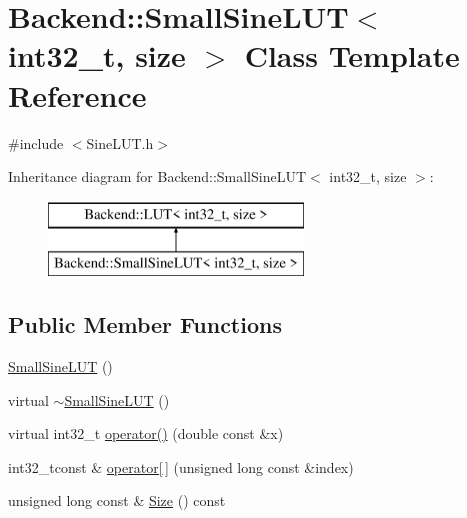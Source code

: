 \hypertarget{class_backend_1_1_small_sine_l_u_t_3_01int32__t_00_01size_01_4}{\section{Backend\+:\+:Small\+Sine\+L\+U\+T$<$ int32\+\_\+t, size $>$ Class Template Reference}
\label{class_backend_1_1_small_sine_l_u_t_3_01int32__t_00_01size_01_4}
}


{\ttfamily \#include $<$Sine\+L\+U\+T.\+h$>$}

Inheritance diagram for Backend\+:\+:Small\+Sine\+L\+U\+T$<$ int32\+\_\+t, size $>$\+:\begin{figure}[H]
\begin{center}
\leavevmode
\includegraphics[height=2.000000cm]{class_backend_1_1_small_sine_l_u_t_3_01int32__t_00_01size_01_4}
\end{center}
\end{figure}
\subsection*{Public Member Functions}
\begin{DoxyCompactItemize}
\item 
\hyperlink{class_backend_1_1_small_sine_l_u_t_3_01int32__t_00_01size_01_4_a05f2fcd7c8a0430dc0137e67d385dc1b}{Small\+Sine\+L\+U\+T} ()
\item 
virtual \hyperlink{class_backend_1_1_small_sine_l_u_t_3_01int32__t_00_01size_01_4_a3db4fc45b900c846711e0cbd828dbbf4}{$\sim$\+Small\+Sine\+L\+U\+T} ()
\item 
virtual int32\+\_\+t \hyperlink{class_backend_1_1_small_sine_l_u_t_3_01int32__t_00_01size_01_4_a7eff39a75385950b722ed2ba7140d4e4}{operator()} (double const \&x)
\item 
int32\+\_\+tconst \& \hyperlink{class_backend_1_1_l_u_t_a9a7c75f36c72778098a091db3269c29c}{operator\mbox{[}$\,$\mbox{]}} (unsigned long const \&index)
\item 
unsigned long const \& \hyperlink{class_backend_1_1_l_u_t_a3ab84f04569e89cd6046da599c6edbae}{Size} () const
\end{DoxyCompactItemize}
